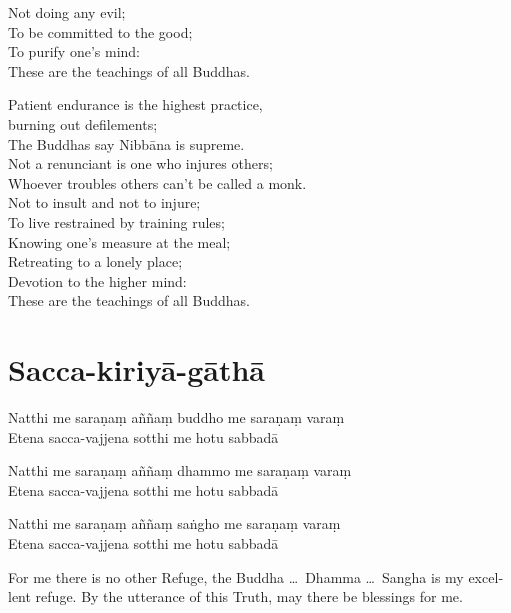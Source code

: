 \begin{paritta}
Not doing any evil;\\
To be committed to the good;\\
To purify one's mind:\\
These are the teachings of all Buddhas.

Patient endurance is the highest practice,\\
\vin burning out defilements;\\
The Buddhas say Nibbāna is supreme.\\
Not a renunciant is one who injures others;\\
Whoever troubles others can't be called a monk.\\

Not to insult and not to injure;\\
To live restrained by training rules;\\
Knowing one's measure at the meal;\\
Retreating to a lonely place;\\
Devotion to the higher mind:\\
These are the teachings of all Buddhas.
\end{paritta}

\section{Sacca-kiriyā-gāthā}

\begin{leader}
\end{leader}


Natthi me saraṇaṃ aññaṃ buddho me saraṇaṃ varaṃ\\
Etena sacca-vajjena sotthi me hotu sabbadā

\clearpage

Natthi me saraṇaṃ aññaṃ dhammo me saraṇaṃ varaṃ\\
Etena sacca-vajjena sotthi me hotu sabbadā

Natthi me saraṇaṃ aññaṃ saṅgho me saraṇaṃ varaṃ\\
Etena sacca-vajjena sotthi me hotu sabbadā


\begin{english}
  For me there is no other Refuge, the Buddha \ldots\ Dhamma \ldots\ Sangha is
  my excellent refuge. By the utterance of this Truth, may there be blessings
  for me.
\end{english}

